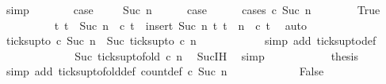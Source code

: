 \begin{isabellebody}
\ simp\isanewline
\ \ \ \ \isamarkupfalse%
\ \isamarkupfalse%
\ {\isacharquery}case\ \isacommand{{\isachardot}}\isamarkupfalse%
\isanewline
{}\isamarkupfalse%
\isanewline
\ \ \isamarkupfalse%
\ {\isacharparenleft}Suc\ n{\isacharparenright}\isanewline
\ \ \ \ \isamarkupfalse%
\ {\isacharquery}case\isanewline
\ \ \ \ \isamarkupfalse%
\ {\isacharparenleft}cases\ {\isacartoucheopen}c\ {\isacharparenleft}Suc\ n{\isacharparenright}{\isacartoucheclose}{\isacharparenright}\isanewline
\ \ \ \ \ \ \isamarkupfalse%
\ True\isanewline
\ \ \ \ \ \ \ \ \isamarkupfalse%
\ {\isacartoucheopen}{\isacharbraceleft}t{\isachardot}\ t\ {\isasymle}\ Suc\ n\ {\isasymand}\ c\ t{\isacharbraceright}\ {\isacharequal}\ insert\ {\isacharparenleft}Suc\ n{\isacharparenright}\ {\isacharbraceleft}t{\isachardot}\ t\ {\isasymle}\ n\ {\isasymand}\ c\ t{\isacharbraceright}{\isacartoucheclose}\ \isamarkupfalse%
\ auto\isanewline
\ \ \ \ \ \ \ \ \isamarkupfalse%
\ {\isacartoucheopen}ticks{\isacharunderscore}up{\isacharunderscore}to\ c\ {\isacharparenleft}Suc\ n{\isacharparenright}\ {\isacharequal}\ Suc\ {\isacharparenleft}ticks{\isacharunderscore}up{\isacharunderscore}to\ c\ n{\isacharparenright}{\isacartoucheclose}\isanewline
\ \ \ \ \ \ \ \ \ \ \isamarkupfalse%
\ {\isacharparenleft}simp\ add{\isacharcolon}\ ticks{\isacharunderscore}up{\isacharunderscore}to{\isacharunderscore}def{\isacharparenright}\isanewline
\ \ \ \ \ \ \ \ \isamarkupfalse%
\ \isamarkupfalse%
\ {\isacartoucheopen}{\isachardot}{\isachardot}{\isachardot}\ {\isacharequal}\ Suc\ {\isacharparenleft}ticks{\isacharunderscore}up{\isacharunderscore}to{\isacharunderscore}fold\ c\ n{\isacharparenright}{\isacartoucheclose}\ \isamarkupfalse%
\ Suc{\isachardot}IH\ \isamarkupfalse%
\ simp\isanewline
\ \ \ \ \ \ \ \ \isamarkupfalse%
\ \isamarkupfalse%
\ {\isacharquery}thesis\ \isamarkupfalse%
\ {\isacharparenleft}simp\ add{\isacharcolon}\ ticks{\isacharunderscore}up{\isacharunderscore}to{\isacharunderscore}fold{\isacharunderscore}def\ count{\isacharunderscore}def\ {\isacartoucheopen}c\ {\isacharparenleft}Suc\ n{\isacharparenright}{\isacartoucheclose}{\isacharparenright}\isanewline
\ \ \ \ \isamarkupfalse%
\isanewline
\ \ \ \ \ \ \isamarkupfalse%
\ False\isanewline
\ \ \ \ \ \ \ \ \isamarkupfalse%

\end{isabellebody}
